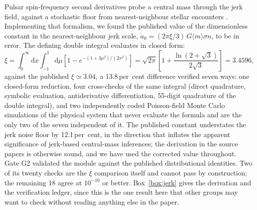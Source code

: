 \documentclass[11pt]{article}
\begin{document}
Pulsar spin-frequency second derivatives probe a central mass through the jerk field, against a stochastic floor from nearest-neighbour stellar encounters \citep{Prager2017,Abbate2019}. Implementing that formalism, we found the published value of the dimensionless constant in the nearest-neighbour jerk scale, $\dot{a}_{0} = (2\pi\xi/3)\,G\langle m \rangle \sigma n$, to be in error. The defining double integral evaluates in closed form:
\begin{equation}
\xi = \int_{0}^{\infty}\!\!\mathrm{d}x \int_{-1}^{1}\!\!\mathrm{d}\mu \left[ 1 - e^{-(1+3\mu^{2})/(2x^{2})} \right]
 = \sqrt{2\pi}\left[ 1 + \frac{\ln(2+\sqrt{3})}{2\sqrt{3}} \right] = 3.4596,
\end{equation}
against the published $\xi \simeq 3.04$, a 13.8\,per~cent difference verified seven ways: one closed-form reduction, four cross-checks of the same integral (direct quadrature, symbolic evaluation, antiderivative differentiation, 55-digit quadrature of the double integral), and two independently coded Poisson-field Monte Carlo simulations of the physical system that never evaluate the formula and are the only two of the seven independent of it. The published constant understates the jerk noise floor by 12.1\,per~cent, in the direction that inflates the apparent significance of jerk-based central-mass inferences; the derivation in the source papers is otherwise sound, and we have used the corrected value throughout. Gate G2 validated the module against the published distributional identities. Two of its twenty checks are the $\xi$ comparison itself and cannot pass by construction; the remaining 18 agree at $10^{-10}$ or better. Box~\ref{box:jerk} gives the derivation and the verification ledger, since this is the one result here that other groups may want to check without reading anything else in the paper.
\end{document}
